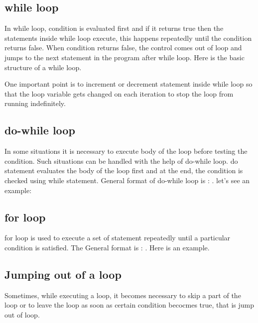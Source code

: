 \documentclass[11pt, a4paper]{article}
\begin{document}
\subsection{while loop}
In while loop, condition is evaluated first and if it returns true then the statements
inside while loop execute, this happens repeatedly until the condition returns false.
When condition returns false, the control comes out of loop and jumps to the next statement
in the program after while loop. Here is the basic structure of a while loop.

One important point is to increment or decrement statement inside while loop so that the loop variable
gets changed on each iteration to stop the loop from running indefinitely.


\subsection{do-while loop}
In some situations it is necessary to execute body of the loop before testing the condition.
Such situations can be handled with the help of do-while loop. do statement evaluates the body
of the loop first and at the end, the condition is checked using while statement. General format
of do-while loop is : . let's see an example:


\subsection{for loop}
for loop is used to execute a set of statement repeatedly until a particular condition is satisfied.
The General format is : . Here
is an example.


\subsection{Jumping out of a loop}
Sometimes, while executing a loop, it becomes necessary to skip a part of the loop or to leave
the loop as soon as certain condition becocmes true, that is jump out of loop.
\end{document}
